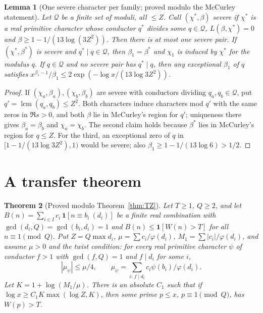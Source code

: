 \documentclass[11pt,reqno]{amsart}
\newtheorem{theorem}{Theorem}[section]
\newtheorem{lemma}[theorem]{Lemma}
\theoremstyle{definition}
\newcommand{\lcm}{\operatorname{lcm}}
\newcommand{\cQ}{\mathcal Q}
\begin{document}
\begin{lemma}[One severe character per family; proved modulo the McCurley statement]\label{lem:severe}
Let $\cQ$ be a finite set of moduli, all $\le Z$.  Call $(\chi^*,\beta)$
\emph{severe} if $\chi^*$ is a real primitive character whose conductor $q^*$
divides some $q\in\cQ$, $L(\beta,\chi^*)=0$ and $\beta\ge1-1/(13\log(3Z^2))$.
Then there is at most one severe pair.  If $(\chi^*,\beta^*)$ is severe and
$q^*\mid q\in\cQ$, then $\beta_1=\beta^*$ and $\chi_1$ is induced by $\chi^*$ for
the modulus $q$.  If $q\in\cQ$ and no severe pair has $q^*\mid q$, then any exceptional
$\beta_1$ of $q$ satisfies $x^{\beta_1-1}/\beta_1\le2\exp(-\log x/(13\log3Z^2))$.
\end{lemma}

\begin{proof}
If $(\chi_a,\beta_a),(\chi_b,\beta_b)$ are severe with conductors dividing
$q_a,q_b\in\cQ$, put $q'=\lcm(q_a,q_b)\le Z^2$.  Both characters induce
characters mod $q'$ with the same zeros in $\Re s>0$, and both $\beta$ lie in
McCurley's region for $q'$; uniqueness there gives $\beta_a=\beta_b$ and
$\chi_a=\chi_b$.  The second claim holds because $\beta^*$ lies in McCurley's
region for $q\le Z$.  For the third, an exceptional zero of $q$ in
$[1-1/(13\log 3Z^2),1)$ would be severe; also $\beta_1\ge1-1/(13\log6)>1/2$.
\end{proof}

\section{A transfer theorem}\label{sec:transfer}

\begin{theorem}[Proved modulo Theorem~\ref{thm:TZ}]\label{thm:transfer}
Let $T\ge1$, $Q\ge2$, and let $B(n)=\sum_{i\in I}c_i\,\mathbf 1[n\equiv b_i\ (d_i)]$
be a finite real combination with $\gcd(d_i,Q)=\gcd(b_i,d_i)=1$ and
$B(n)\le\mathbf 1[W(n)>T]$ for all $n\equiv1\pmod Q$.  Put
$Z=Q\max d_i$, $\mu=\sum c_i/\varphi(d_i)$, $M_1=\sum|c_i|/\varphi(d_i)$, and assume
$\mu>0$ and the \emph{twist condition}: for every real primitive character
$\psi$ of conductor $f>1$ with $\gcd(f,Q)=1$ and $f\mid d_i$ for some $i$,
\[
 |\mu_\psi|\le\mu/4,\qquad \mu_\psi=\sum_{i:\,f\mid d_i}c_i\psi(b_i)/\varphi(d_i).
\]
Let $K=1+\log(M_1/\mu)$.  There is an absolute $C_1$ such that if
$\log x\ge C_1K\max(\log Z,K)$, then some prime $p\le x$, $p\equiv1\pmod Q$,
has $W(p)>T$.
\end{theorem}
\end{document}
